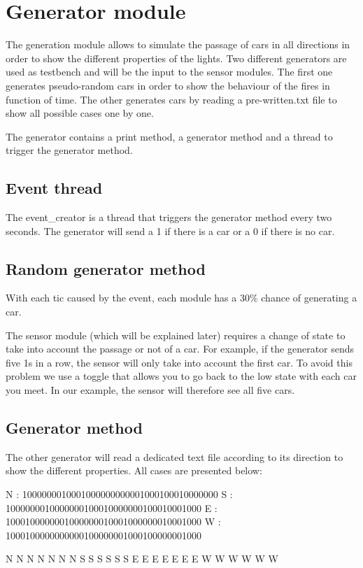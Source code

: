 \section{Generator module}

The generation module allows to simulate the passage of cars in all directions in order to show the different properties of the lights. Two different generators are used as testbench and will be the input to the sensor modules. 
The first one generates pseudo-random cars in order to show the behaviour of the fires in function of time.
The other generates cars by reading a pre-written.txt file to show all possible cases one by one. 

The generator contains a print method, a generator method and a thread to trigger the generator method.

\subsection{Event thread}

The event{\_}creator is a thread that triggers the generator method every two seconds. The generator will send a 1 if there is a car or a 0 if there is no car.

\subsection{Random generator method}

With each tic caused by the event, each module has a 30{\%} chance of generating a car.

The sensor module (which will be explained later) requires a change of state to take into account the passage or not of a car. For example, if the generator sends five 1s in a row, the sensor will only take into account the first car. 
To avoid this problem we use a toggle that allows you to go back to the low state with each car you meet. In our example, the sensor will therefore see all five cars.

\subsection{Generator method}

The other generator will read a dedicated text file according to its direction to show the different properties. 
All cases are presented below: 

N : 1000000010001000000000001000100010000000
S : 1000000010000000100010000000100010001000
E : 1000100000001000000010001000000010001000
W : 1000100000000000100000001000100000001000

	N		N	N	N		N	N	N
	S		S			S		S	S	S
	E	E		E		E	E		E	E
	W	W			W		W	W		W
